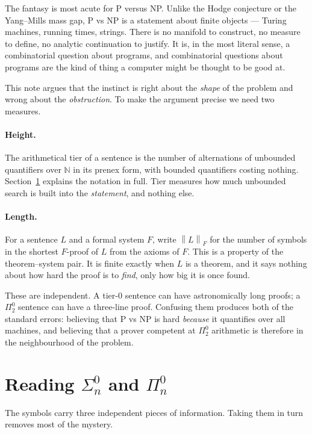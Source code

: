 \documentclass[11pt,a4paper]{article}
\newcommand{\Sig}[2]{\Sigma^{#1}_{#2}}
\newcommand{\Pai}[2]{\Pi^{#1}_{#2}}
\newcommand{\shortest}[1]{\left\lVert #1 \right\rVert}
\begin{document}
The fantasy is most acute for P versus NP. Unlike the Hodge conjecture or the
Yang--Mills mass gap, P vs NP is a statement about finite objects --- Turing
machines, running times, strings. There is no manifold to construct, no
measure to define, no analytic continuation to justify. It is, in the most
literal sense, a combinatorial question about programs, and combinatorial
questions about programs are the kind of thing a computer might be thought to
be good at.

This note argues that the instinct is right about the \emph{shape} of the
problem and wrong about the \emph{obstruction}. To make the argument precise
we need two measures.

\paragraph{Height.} The arithmetical tier of a sentence is the number of
alternations of unbounded quantifiers over $\mathbb{N}$ in its prenex form,
with bounded quantifiers costing nothing. Section~\ref{sec:notation} explains
the notation in full. Tier measures how much unbounded search is built into
the \emph{statement}, and nothing else.

\paragraph{Length.} For a sentence $L$ and a formal system $F$, write
$\shortest{L}_F$ for the number of symbols in the shortest $F$-proof of $L$
from the axioms of $F$. This is a property of the theorem--system pair. It is
finite exactly when $L$ is a theorem, and it says nothing about how hard the
proof is to \emph{find}, only how big it is once found.

These are independent. A tier-$0$ sentence can have astronomically long
proofs; a $\Pai{0}{2}$ sentence can have a three-line proof. Confusing them
produces both of the standard errors: believing that P vs NP is hard
\emph{because} it quantifies over all machines, and believing that a prover
competent at $\Pai{0}{2}$ arithmetic is therefore in the neighbourhood of the
problem.

\section{Reading $\Sig{0}{n}$ and $\Pai{0}{n}$}\label{sec:notation}

The symbols carry three independent pieces of information. Taking them in
turn removes most of the mystery.
\end{document}
